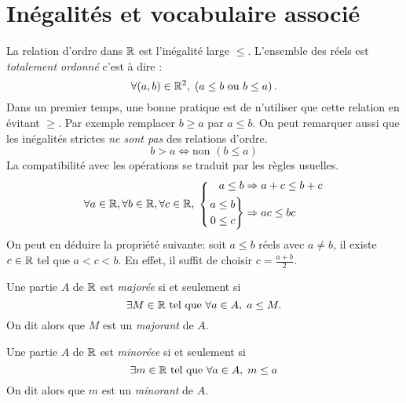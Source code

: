 
\section{Inégalités et vocabulaire associé}
La relation d'ordre dans $\mathbb{R}$ est l'inégalité large $\leq$. L'ensemble des réels est \emph{totalement ordonné} c'est à dire :
\[
  \forall (a,b)\in \mathbb{R}^2, \; \left( a \leq b \text{ ou } b \leq a\right).
\]
Dans un premier temps, une bonne pratique est de n'utiliser que cette relation en évitant $\geq$. Par exemple remplacer $b\geq a$ par $a\leq b$. On peut remarquer aussi que les inégalités strictes \emph{ne sont pas} des relations d'ordre.
\begin{displaymath}
 b > a \Leftrightarrow \text{non }\left( b \leq a\right) 
\end{displaymath}
La compatibilité avec les opérations se traduit par les règles usuelles.
\begin{displaymath}
\forall a\in \mathbb{R}, \forall b\in \mathbb{R},\forall c\in \mathbb{R},\;
\left\lbrace 
     \begin{aligned}
         a \leq b &\Rightarrow a + c \leq b + c\\
         \left. 
             \begin{aligned}
                a &\leq b \\ 0 &\leq c 
             \end{aligned}
         \right\rbrace &\Rightarrow ac \leq bc
    \end{aligned}
\right. 
\end{displaymath}
On peut en déduire la propriété suivante: soit $a\leq b$ réels avec $a\neq b$, il existe $c\in \mathbb{R}$ tel que $a < c < b$. En effet, il suffit de choisir $c= \frac{a+b}{2}$. 

\begin{defi}  
  Une partie $A$ de $\mathbb{R}$ est \emph{majorée} si et seulement si 
  \begin{displaymath}
    \exists M\in \mathbb{R} \text{ tel que } \forall a\in A, \; a\leq M .
  \end{displaymath}
  On dit alors que $M$ est un \emph{majorant} de $A$.
\end{defi}
\begin{defi}  
  Une partie $A$ de $\mathbb{R}$ est \emph{minoréee} si et seulement si 
  \begin{displaymath}
    \exists m\in \mathbb{R} \text{ tel que } \forall a\in A, \; m\leq a
  \end{displaymath}
  On dit alors que $m$ est un \emph{minorant} de $A$.
\end{defi}

